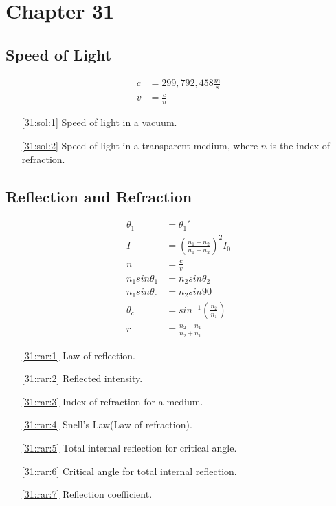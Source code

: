 \documentclass{subfile}
\begin{document}
\section{Chapter 31}
\subsection{Speed of Light}
\begin{align}
  c &= 299,792,458\frac{m}{s} \label{31:sol:1}\\
  v &= \frac{c}{n} \label{31:sol:2}
\end{align}
\begin{enumerate}
  \item[\eqref{31:sol:1}] Speed of light in a vacuum.
  \item[\eqref{31:sol:2}] Speed of light in a transparent medium, where $n$ is the index of refraction.
\end{enumerate}
\subsection{Reflection and Refraction}
\begin{align}
  \theta_{1} &= \theta_{1}' \label{31:rar:1}\\
  I &= \left( \frac{n_1-n_2}{n_1+n_2} \right)^2 I_0 \label{31:rar:2}\\
  n &= \frac{c}{v} \label{31:rar:3}\\
  n_1 sin \theta_{1} &= n_2 sin \theta_2 \label{31:rar:4}\\
  n_1 sin \theta_{c} &= n_2 sin 90 \label{31:rar:5}\\
  \theta_c &= sin^{-1}\left(\frac{n_2}{n_1}\right) \label{31:rar:6}\\
  r &= \frac{n_2-n_1}{n_2+n_1}\label{31:rar:7}
\end{align}
\begin{enumerate}
  \item[\eqref{31:rar:1}] Law of reflection.
  \item[\eqref{31:rar:2}] Reflected intensity.
  \item[\eqref{31:rar:3}] Index of refraction for a medium.
  \item[\eqref{31:rar:4}] Snell's Law(Law of refraction).
  \item[\eqref{31:rar:5}] Total internal reflection for critical angle.
  \item[\eqref{31:rar:6}] Critical angle for total internal reflection.
  \item[\eqref{31:rar:7}] Reflection coefficient.
\end{enumerate}
\end{document}
